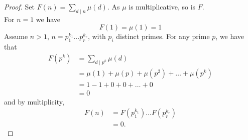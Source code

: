 \documentclass{report}
\begin{document}
\begin{proof}
				Set $F(n)=\sum_{d \mid n} \mu(d)$. As $\mu$ is multiplicative, so is $F$.\\
				For $n=1$ we have \[ F(1)= \mu(1)=1\]
				Assume $n>1$, $n=p_1^{k_1} \dots p_r^{k_r}$, with $p_i$ distinct primes. For any prime $p$, we have that \begin{equation*}
				\begin{aligned}
				F(p^k)&=\sum_{d \mid p^k} \mu(d)\\
				&= \mu(1) + \mu(p) + \mu(p^2) + \dots + \mu(p^k)\\
				&= 1 -1 + 0 + 0 + \dots + 0\\
				&=0
				\end{aligned}
				\end{equation*}
				and by multiplicity, \begin{equation*}
				\begin{aligned}
				F(n)&=F(p_1^{k_1}) \dots F(p_r^{k_r})\\
				&=0.
				\end{aligned}
				\end{equation*}
\end{proof}
\end{document}
